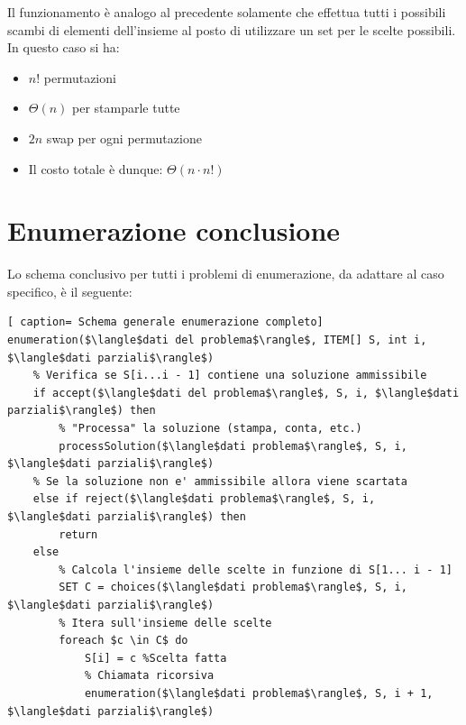 \documentclass[../cheatSheetAlgoritmi.tex]{subfiles}
\begin{document}
Il funzionamento è analogo al precedente solamente che effettua tutti i possibili scambi di elementi dell'insieme al posto di utilizzare un set per le scelte possibili. \\
In questo caso si ha:
\begin{itemize}
	\item $n!$ permutazioni
	\item $\Theta(n)$ per stamparle tutte
	\item $2n$ swap per ogni permutazione
	\item Il costo totale è dunque: $\Theta(n \cdot n!)$
\end{itemize}

\section{Enumerazione conclusione}
Lo schema conclusivo per tutti i problemi di enumerazione, da adattare al caso specifico, è il seguente:
 \begin{lstlisting}[ caption= Schema generale enumerazione completo]
enumeration($\langle$dati del problema$\rangle$, ITEM[] S, int i, $\langle$dati parziali$\rangle$)
	% Verifica se S[i...i - 1] contiene una soluzione ammissibile
	if accept($\langle$dati del problema$\rangle$, S, i, $\langle$dati parziali$\rangle$) then
		% "Processa" la soluzione (stampa, conta, etc.)
		processSolution($\langle$dati problema$\rangle$, S, i, $\langle$dati parziali$\rangle$)
	% Se la soluzione non e' ammissibile allora viene scartata
	else if reject($\langle$dati problema$\rangle$, S, i, $\langle$dati parziali$\rangle$) then
		return
	else
		% Calcola l'insieme delle scelte in funzione di S[1... i - 1]
		SET C = choices($\langle$dati problema$\rangle$, S, i, $\langle$dati parziali$\rangle$)
		% Itera sull'insieme delle scelte
		foreach $c \in C$ do
			S[i] = c %Scelta fatta
			% Chiamata ricorsiva
			enumeration($\langle$dati problema$\rangle$, S, i + 1, $\langle$dati parziali$\rangle$)
\end{lstlisting}
\end{document}

